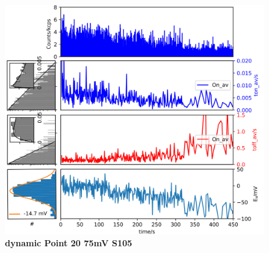 \documentclass[11pt,a4paper,onecolumn]{article}
\begin{document}
\begin{figure}
  \centering
  \includegraphics[width=\textwidth]{dynamic_Point_21_75mV_S105}
  \caption{\textbf{dynamic Point 20 75mV S105}}
  \label{fig:dynamic_Point_21_75mV_S105}
\end{figure}

\end{document}
